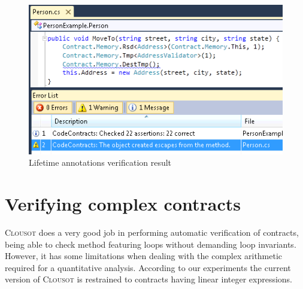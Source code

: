 \begin{figure}[tb]
\includegraphics[width=1\linewidth, clip]{screen_verif_dest2.png}
\vspace{-2em}
\caption{Lifetime annotations verification result}
\vspace*{-1em}
\label{ex2}
\end{figure}



\section{Verifying complex contracts} \label{sec:barvinok}
\textsc{Clousot} does a very good job in performing automatic verification of contracts, being able to check method featuring loops without demanding loop invariants. 
However, it has some limitations when dealing with the complex arithmetic required for a quantitative analysis. According to our experiments the current version of \textsc{Clousot} is restrained to contracts having linear integer expressions.

